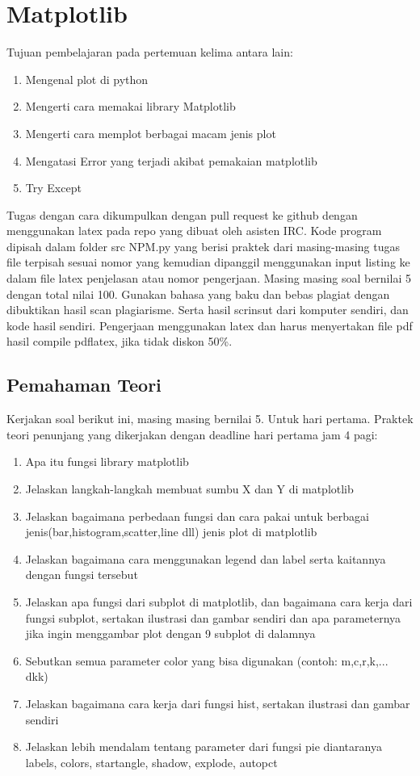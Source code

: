 \chapter{Matplotlib}

Tujuan pembelajaran pada pertemuan kelima antara lain:
\begin{enumerate}
\item
Mengenal plot di python
\item
Mengerti cara memakai library Matplotlib
\item
Mengerti cara memplot berbagai macam jenis plot
\item
Mengatasi Error yang terjadi akibat pemakaian matplotlib
\item
Try Except
\end{enumerate}
Tugas dengan cara dikumpulkan dengan pull request ke github dengan menggunakan latex pada repo yang dibuat oleh asisten IRC. Kode program dipisah dalam folder src NPM.py yang berisi praktek dari masing-masing tugas file terpisah sesuai nomor yang kemudian dipanggil menggunakan input listing ke dalam file latex penjelasan atau nomor pengerjaan. Masing masing soal bernilai 5 dengan total nilai 100. Gunakan bahasa yang baku dan bebas plagiat dengan dibuktikan hasil scan plagiarisme. Serta hasil scrinsut dari komputer sendiri, dan kode hasil sendiri. Pengerjaan menggunakan latex dan harus menyertakan file pdf hasil compile pdflatex, jika tidak diskon 50\%.


\section{Pemahaman Teori}
Kerjakan soal berikut ini, masing masing bernilai 5. Untuk hari pertama.
Praktek teori penunjang yang dikerjakan dengan deadline hari pertama jam 4 pagi:
\begin{enumerate}
\item
Apa itu fungsi library matplotlib
\item
Jelaskan langkah-langkah membuat sumbu X dan Y di matplotlib
\item
Jelaskan bagaimana perbedaan fungsi dan cara pakai untuk berbagai jenis(bar,histogram,scatter,line dll) jenis plot di matplotlib
\item
Jelaskan bagaimana cara menggunakan legend dan label serta kaitannya dengan fungsi tersebut
\item
Jelaskan apa fungsi dari subplot di matplotlib, dan bagaimana cara kerja dari fungsi subplot, sertakan ilustrasi dan gambar sendiri dan apa parameternya jika ingin menggambar plot dengan 9 subplot di dalamnya
\item
Sebutkan semua parameter color yang bisa digunakan (contoh: m,c,r,k,... dkk)
\item
Jelaskan bagaimana cara kerja dari fungsi hist, sertakan ilustrasi dan gambar sendiri
\item
Jelaskan lebih mendalam tentang parameter dari fungsi pie diantaranya labels, colors, startangle, shadow, explode, autopct
\end{enumerate}

